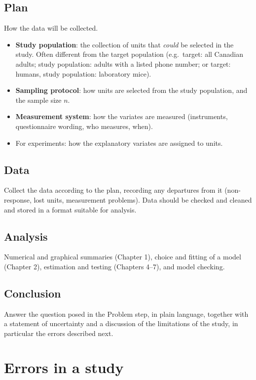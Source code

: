 \subsection{Plan}
How the data will be collected.
\begin{itemize}
  \item \textbf{Study population}: the collection of units that \emph{could} be
        selected in the study. Often different from the target population (e.g.\ target:
        all Canadian adults; study population: adults with a listed phone number; or
        target: humans, study population: laboratory mice).
  \item \textbf{Sampling protocol}: how units are selected from the study population, and
        the sample size $n$.
  \item \textbf{Measurement system}: how the variates are measured (instruments,
        questionnaire wording, who measures, when).
  \item For experiments: how the explanatory variates are assigned to units.
\end{itemize}

\subsection{Data}
Collect the data according to the plan, recording any departures from it (non-response,
lost units, measurement problems). Data should be checked and cleaned and stored
in a format suitable for analysis.

\subsection{Analysis}
Numerical and graphical summaries (Chapter 1), choice and fitting of a model
(Chapter 2), estimation and testing (Chapters 4--7), and model checking.

\subsection{Conclusion}
Answer the question posed in the Problem step, in plain language, together with a
statement of uncertainty and a discussion of the limitations of the study, in particular
the errors described next.

\section{Errors in a study}

